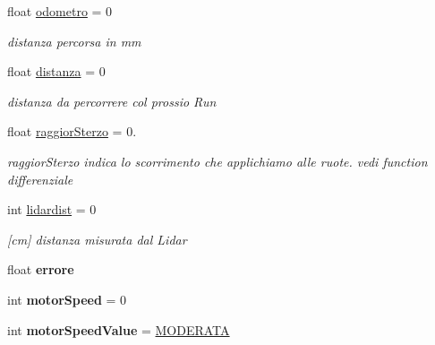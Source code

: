 \begin{DoxyCompactItemize}
float \mbox{\hyperlink{ari_pi__2_d_c__esp__08_8ino_ac36ade784c05554d24241a2fa860bbaa}{odometro}} = 0
\begin{DoxyCompactList}\small\item\em distanza percorsa in mm \end{DoxyCompactList}\item 
\mbox{\label{ari_pi__2_d_c__esp__08_8ino_aa0ded4438d2bf98ac92bf5e3680d5084}} 
float \mbox{\hyperlink{ari_pi__2_d_c__esp__08_8ino_aa0ded4438d2bf98ac92bf5e3680d5084}{distanza}} = 0
\begin{DoxyCompactList}\small\item\em distanza da percorrere col prossio Run \end{DoxyCompactList}\item 
\mbox{\label{ari_pi__2_d_c__esp__08_8ino_a6bd7fe73202cbe57f50f29e17bf7f1d2}} 
float \mbox{\hyperlink{ari_pi__2_d_c__esp__08_8ino_a6bd7fe73202cbe57f50f29e17bf7f1d2}{raggior\+Sterzo}} = 0.
\begin{DoxyCompactList}\small\item\em raggior\+Sterzo indica lo scorrimento che applichiamo alle ruote. vedi function differenziale \end{DoxyCompactList}\item 
\mbox{\label{ari_pi__2_d_c__esp__08_8ino_a439debc276431dbf94c5d68081e6d38c}} 
int \mbox{\hyperlink{ari_pi__2_d_c__esp__08_8ino_a439debc276431dbf94c5d68081e6d38c}{lidardist}} = 0
\begin{DoxyCompactList}\small\item\em \mbox{[}cm\mbox{]} distanza misurata dal Lidar \end{DoxyCompactList}\item 
\mbox{\label{ari_pi__2_d_c__esp__08_8ino_a249abd6fb895eba5af34eb2516a7dea3}} 
float {\bfseries errore}
\item 
\mbox{\label{ari_pi__2_d_c__esp__08_8ino_a8dfd382ee3674a1db48ad2c69bcaaf56}} 
int {\bfseries motor\+Speed} = 0
\item 
\mbox{\label{ari_pi__2_d_c__esp__08_8ino_a6c202cc2e1ecd2889d313233e5360ae9}} 
int {\bfseries motor\+Speed\+Value} = \mbox{\hyperlink{ari_pi__2_d_c__esp__08_8ino_a4774b749cfc65db93b2e726543c9115f}{M\+O\+D\+E\+R\+A\+TA}}

\end{DoxyCompactItemize}
